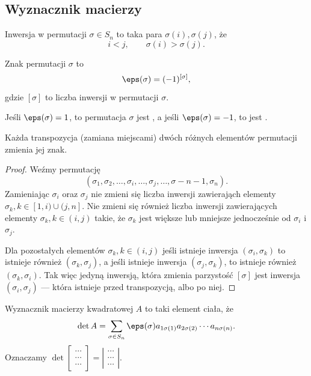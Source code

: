 \subsection{Wyznacznik macierzy}
\begin{definition}
    Inwersja w permutacji $\sigma \in S_n$ to taka para $\sigma(i), \sigma(j)$, że
    \[ i < j, \qquad \sigma(i) > \sigma(j). \]
\end{definition}

\begin{definition}
    Znak permutacji $\sigma$ to
    \[ \eps(\sigma) = (-1)^{[\sigma]}, \]
    gdzie $[\sigma]$ to liczba inwersji w permutacji $\sigma$.
\end{definition}

Jeśli $\eps(\sigma) = 1$, to permutacja $\sigma$ jest , a jeśli  $\eps(\sigma) = -1$, to jest .

\begin{fact}
    Każda transpozycja (zamiana miejscami) dwóch różnych elementów permutacji zmienia jej znak.
\end{fact}
\begin{proof}
    Weźmy permutację
    \[ (\sigma_1, \sigma_2, \ldots, \sigma_i, \ldots, \sigma_j, \ldots, \sigma-{n-1}, \sigma_n). \]
    Zamieniając $\sigma_i$ oraz $\sigma_j$ nie zmieni się liczba inwersji zawierająch elementy $\sigma_k, k \in [1,i)\cup(j,n]$. Nie zmieni się również liczba inwersji zawierających elementy $\sigma_k, k \in (i,j)$ takie, że $\sigma_k$ jest większe lub mniejsze jednocześnie od $\sigma_i$ i $\sigma_j$.

    Dla pozostałych elementów $\sigma_k, k \in (i, j)$ jeśli istnieje inwersja $(\sigma_i, \sigma_k)$ to istnieje również $(\sigma_k, \sigma_j)$, a jeśli istnieje inwersja $(\sigma_j, \sigma_k)$, to istnieje również $(\sigma_k, \sigma_i)$. Tak więc jedyną inwersją, która zmienia parzystość $[\sigma]$ jest inwersja $(\sigma_i, \sigma_j)$ --- która istnieje przed transpozycją, albo po niej.
\end{proof}

\begin{definition}
    Wyznacznik macierzy kwadratowej $A$ to taki element ciała, że
    \[ \det A = \sum_{\sigma\in S_n} \eps(\sigma)a_{1\sigma(1)}a_{2\sigma(2)}\cdots a_{n\sigma(n)}. \]
    Oznaczamy $\det
    \left[\begin{smallmatrix}
        \cdots \\ \cdots \\ \cdots
    \end{smallmatrix}\right] =
    \left|\begin{smallmatrix}
        \cdots \\ \cdots \\ \cdots
    \end{smallmatrix}\right|$.
\end{definition}

